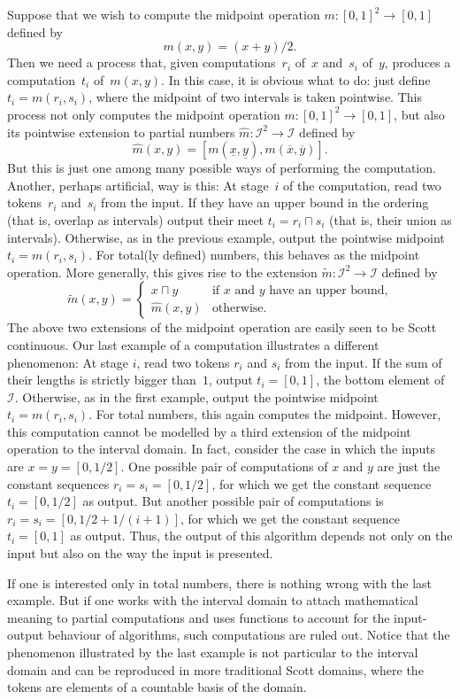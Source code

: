 \documentclass[12pt]{article}
\newcommand{\meet}{\sqcap}
\newcommand{\I}{\mathcal{I}}
\begin{document}
Suppose that we wish to compute the midpoint operation $m:[0,1]^2 \to
[0,1]$ defined by
\[
m(x,y) = (x+y)/2.
\]
Then we need a process that, given computations~$r_i$ of~$x$ and~$s_i$
of~$y$, produces a computation~$t_i$ of~$m(x,y)$. In this case, it is
obvious what to do: just define $t_i = m(r_i,s_i)$, where the midpoint
of two intervals is taken pointwise. This process not only computes
the midpoint operation $m:[0,1]^2 \to [0,1]$, but also its
pointwise extension to partial numbers $\hat{m}:\I^2 \to \I$
defined by
\[
\hat{m}(x,y) = 
[m(\underline{x},\underline{y}),m(\overline{x},\overline{y})].
\]
But this is just one among many possible ways of performing the
computation. Another, perhaps artificial, way is this: At stage~$i$ of
the computation, read two tokens~$r_i$ and~$s_i$ from the input. If
they have an upper bound in the ordering (that is, overlap as
intervals) output their meet $t_i = r_i \sqcap s_i$ (that is, their
union as intervals). Otherwise, as in the previous example, output the
pointwise midpoint $t_i = m(r_i,s_i)$. For total(ly defined) numbers,
this behaves as the midpoint operation. More generally, this gives
rise to the extension $\tilde{m}:\I^2 \to \I$ defined by
\[
\tilde{m}(x,y) = 
\begin{cases}
x \meet y & \text{if $x$ and $y$ have an upper bound,} \\
\hat{m}(x,y) & \text{otherwise.} 
\end{cases}
\]
The above two extensions of the midpoint operation are easily seen to
be Scott continuous.  Our last example of a computation illustrates a
different phenomenon: At stage $i$, read two tokens $r_i$ and $s_i$
from the input. If the sum of their lengths is strictly bigger
than~$1$, output $t_i = [0,1]$, the bottom element of~$\I$.
Otherwise, as in the first example, output the pointwise midpoint $t_i
= m(r_i,s_i)$. For total numbers, this again computes the midpoint.
However, this computation cannot be modelled by a third extension of
the midpoint operation to the interval domain. In fact, consider the
case in which the inputs are $x=y=[0,1/2]$. One possible pair of
computations of $x$ and $y$ are just the constant sequences
$r_i=s_i=[0,1/2]$, for which we get the constant sequence
$t_i=[0,1/2]$ as output. But another possible pair of computations is
$r_i=s_i=[0,1/2+1/(i+1)]$, for which we get the constant sequence
$t_i=[0,1]$ as output. Thus, the output of this algorithm depends not
only on the input but also on the way the input is presented.

If one is interested only in total numbers, there is nothing wrong
with the last example. But if one works with the interval domain to
attach mathematical meaning to partial computations and uses functions
to account for the input-output behaviour of algorithms, such
computations are ruled out. Notice that the phenomenon illustrated by
the last example is not particular to the interval domain and can be
reproduced in more traditional Scott domains, where the tokens are
elements of a countable basis of the domain.
\end{document}

